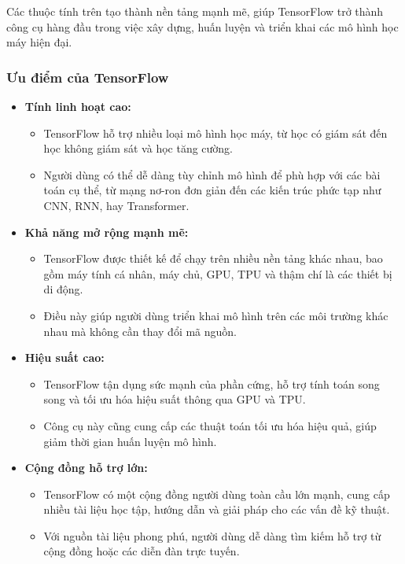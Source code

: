 Các thuộc tính trên tạo thành nền tảng mạnh mẽ, giúp TensorFlow trở thành công cụ hàng đầu trong việc xây dựng, huấn luyện và triển khai các mô hình học máy hiện đại.

\subsubsection{Ưu điểm của TensorFlow}

\begin{itemize}
    \item \textbf{Tính linh hoạt cao:} 
    \begin{itemize}
        \item TensorFlow hỗ trợ nhiều loại mô hình học máy, từ học có giám sát đến học không giám sát và học tăng cường.
        \item Người dùng có thể dễ dàng tùy chỉnh mô hình để phù hợp với các bài toán cụ thể, từ mạng nơ-ron đơn giản đến các kiến trúc phức tạp như CNN, RNN, hay Transformer.
    \end{itemize}
    \item \textbf{Khả năng mở rộng mạnh mẽ:} 
    \begin{itemize}
        \item TensorFlow được thiết kế để chạy trên nhiều nền tảng khác nhau, bao gồm máy tính cá nhân, máy chủ, GPU, TPU và thậm chí là các thiết bị di động.
        \item Điều này giúp người dùng triển khai mô hình trên các môi trường khác nhau mà không cần thay đổi mã nguồn.
    \end{itemize}
    \item \textbf{Hiệu suất cao:} 
    \begin{itemize}
        \item TensorFlow tận dụng sức mạnh của phần cứng, hỗ trợ tính toán song song và tối ưu hóa hiệu suất thông qua GPU và TPU.
        \item Công cụ này cũng cung cấp các thuật toán tối ưu hóa hiệu quả, giúp giảm thời gian huấn luyện mô hình.
    \end{itemize}
    \item \textbf{Cộng đồng hỗ trợ lớn:}
    \begin{itemize}
        \item TensorFlow có một cộng đồng người dùng toàn cầu lớn mạnh, cung cấp nhiều tài liệu học tập, hướng dẫn và giải pháp cho các vấn đề kỹ thuật.
        \item Với nguồn tài liệu phong phú, người dùng dễ dàng tìm kiếm hỗ trợ từ cộng đồng hoặc các diễn đàn trực tuyến.

\end{itemize}
\end{itemize}
